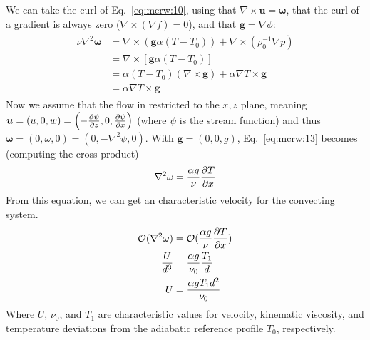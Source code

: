 \documentclass[document.tex]{subfiles}
\begin{document}
\begin{mdframed}
    We can take the curl of Eq.~\eqref{eq:mcrw:10}, using that $\nabla \times \bm{u} = \bm{\omega}$, that the curl of a gradient is always zero ($\nabla \times (\nabla f) =0$), and that $\bm{g} = \nabla \phi$: 
    \begin{align} \label{eq:mcrw:13}
        \begin{split}
            \nu \nabla^2\bm{\omega} &= \nabla \times (\bm{g}\alpha(T-T_0))+\nabla \times (\rho_0^{-1}\nabla p) \\
        &= \nabla \times [\bm{g}\alpha(T-T_0)] \\
        &= \alpha(T-T_0)(\nabla \times \bm{g})+ \alpha \nabla T \times \bm{g} \\
        & = \alpha \nabla T \times \bm{g}
        \end{split}
    \end{align}
Now we assume that the flow in restricted to the $x,z$ plane, meaning 
$\bm{u} = (u,0,w) = \left(-\pdv{\psi}{z}, 0, \pdv{\psi}{x}\right)$ (where $\psi$ is the stream function) 
and thus $\bm{\omega} = (0,\omega, 0) = (0, -\nabla^2\psi, 0)$. With $\bm{g} = (0,0,g)$, Eq.~\ref{eq:mcrw:13} becomes (computing the cross product)
\begin{align} \label{eq:mcrw:16}
    \nabla^2\omega = \frac{\alpha g}{\nu}\pdv{T}{x}
\end{align}
From this equation, we can get an characteristic velocity for the convecting system. 
\begin{align} \label{eq:U}
    \begin{split}
       \mathcal{O}(\nabla^2\omega) &=\mathcal{O}(\frac{\alpha g}{\nu} \pdv{T}{x}) \\
    \frac{U}{d^3} &= \frac{\alpha g}{\nu_0} \frac{T_1}{d} \\
    U &= \frac{\alpha g T_1 d^2}{\nu_0} 
    \end{split}
\end{align}
Where $U$, $\nu_0$, and $T_1$ are characteristic values for velocity, kinematic viscosity, and temperature deviations from the adiabatic reference profile $T_0$, respectively. 
\end{mdframed}
\end{document}
